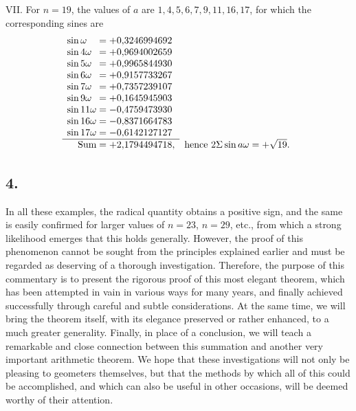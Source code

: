 \documentclass[twoside,12pt, showframe]{memoir}
\begin{document}
VII. For \(n=19\), the values of \(a\) are \(1,4,5,6,7,9,11,16,17\), for which the corresponding sines are
\[\begin{array}{rl}
 \sin \omega\phantom{11}=+0{,}3246994692 \phantom{,}&\\
 \sin 4 \omega\phantom{1}=+0{,}9694002659 \phantom{,}&\\
 \sin 5 \omega\phantom{1}=+0{,}9965844930 \phantom{,}&\\
\sin 6 \omega\phantom{1}=+0{,}9157733267 \phantom{,}&\\
 \sin 7 \omega\phantom{1}=+0{,}7357239107 \phantom{,}&\\
 \sin 9 \omega\phantom{1}=+0{,}1645945903 \phantom{,}&\\
 \sin 11 \omega=-0{,}4759473930 \phantom{,}&\\
 \sin 16 \omega=-0{,}8371664783 \phantom{,}&\\
 \sin 17 \omega=-0{,}6142127127 \phantom{,}&\\ 
 \cline{1-1} \text{Sum}=+2{,}1794494718,&\text{hence } 2 \Sigma \sin a \omega=+\sqrt{19}.
\end{array}\]\clearpage\noindent%
%

\subsection*{4.}

In all these examples, the radical quantity obtains a positive sign, and the same is easily confirmed for larger values of \(n=23\), \(n=29\), etc., from which a strong likelihood emerges that this holds generally. However, the proof of this phenomenon cannot be sought from the principles explained earlier and must be regarded as deserving of a thorough investigation. Therefore, the purpose of this commentary is to present the rigorous proof of this most elegant theorem, which has been attempted in vain in various ways for many years, and finally achieved successfully through careful and subtle considerations. At the same time, we will bring the theorem itself, with its elegance preserved or rather enhanced, to a much greater generality. Finally, in place of a conclusion, we will teach a remarkable and close connection between this summation and another very important arithmetic theorem. We hope that these investigations will not only be pleasing to geometers themselves, but that the methods by which all of this could be accomplished, and which can also be useful in other occasions, will be deemed worthy of their attention.
%
\end{document}
